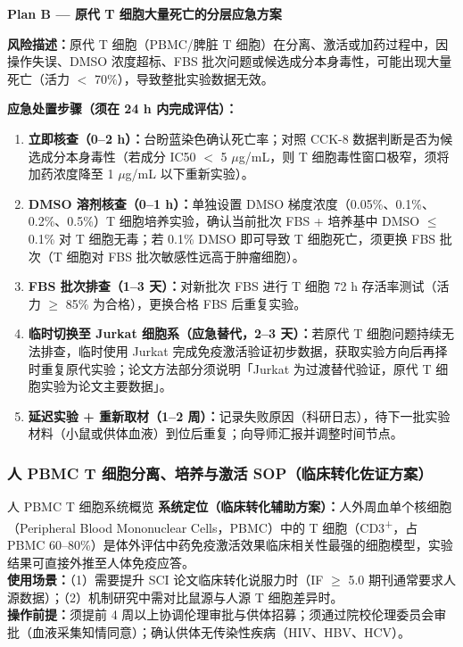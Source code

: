 \documentclass[12pt,a4paper,twoside]{article}
\begin{document}
\begin{warningbox}
\textbf{Plan B --- 原代 T 细胞大量死亡的分层应急方案}

\textbf{风险描述：}原代 T 细胞（PBMC/脾脏 T 细胞）在分离、激活或加药过程中，因操作失误、DMSO 浓度超标、FBS 批次问题或候选成分本身毒性，可能出现大量死亡（活力 $<$ 70\%），导致整批实验数据无效。

\textbf{应急处置步骤（须在 24 h 内完成评估）：}
\begin{enumerate}
  \item \textbf{立即核查（0--2 h）：}台盼蓝染色确认死亡率；对照 CCK-8 数据判断是否为候选成分本身毒性（若成分 IC50 $<$ 5 $\mu$g/mL，则 T 细胞毒性窗口极窄，须将加药浓度降至 1 $\mu$g/mL 以下重新实验）。
  \item \textbf{DMSO 溶剂核查（0--1 h）：}单独设置 DMSO 梯度浓度（0.05\%、0.1\%、0.2\%、0.5\%）T 细胞培养实验，确认当前批次 FBS + 培养基中 DMSO $\leq$ 0.1\% 对 T 细胞无毒；若 0.1\% DMSO 即可导致 T 细胞死亡，须更换 FBS 批次（T 细胞对 FBS 批次敏感性远高于肿瘤细胞）。
  \item \textbf{FBS 批次排查（1--3 天）：}对新批次 FBS 进行 T 细胞 72 h 存活率测试（活力 $\geq$ 85\% 为合格），更换合格 FBS 后重复实验。
  \item \textbf{临时切换至 Jurkat 细胞系（应急替代，2--3 天）：}若原代 T 细胞问题持续无法排查，临时使用 Jurkat 完成免疫激活验证初步数据，获取实验方向后再择时重复原代实验；论文方法部分须说明「Jurkat 为过渡替代验证，原代 T 细胞实验为论文主要数据」。
  \item \textbf{延迟实验 + 重新取材（1--2 周）：}记录失败原因（科研日志），待下一批实验材料（小鼠或供体血液）到位后重复；向导师汇报并调整时间节点。
\end{enumerate}
\end{warningbox}

\subsubsection{人 PBMC T 细胞分离、培养与激活 SOP（临床转化佐证方案）}
\label{sec:pbmc_tcell}

\begin{infobox}{人 PBMC T 细胞系统概览}
\textbf{系统定位（临床转化辅助方案）：}人外周血单个核细胞（Peripheral Blood Mononuclear Cells，PBMC）中的 T 细胞（CD3\textsuperscript{+}，占 PBMC 60--80\%）是体外评估中药免疫激活效果临床相关性最强的细胞模型，实验结果可直接外推至人体免疫应答。\\
\textbf{使用场景：}（1）需要提升 SCI 论文临床转化说服力时（IF $\geq$ 5.0 期刊通常要求人源数据）；（2）机制研究中需对比鼠源与人源 T 细胞差异时。\\
\textbf{操作前提：}须提前 4 周以上协调伦理审批与供体招募；须通过院校伦理委员会审批（血液采集知情同意）；确认供体无传染性疾病（HIV、HBV、HCV）。
\end{infobox}
\end{document}
